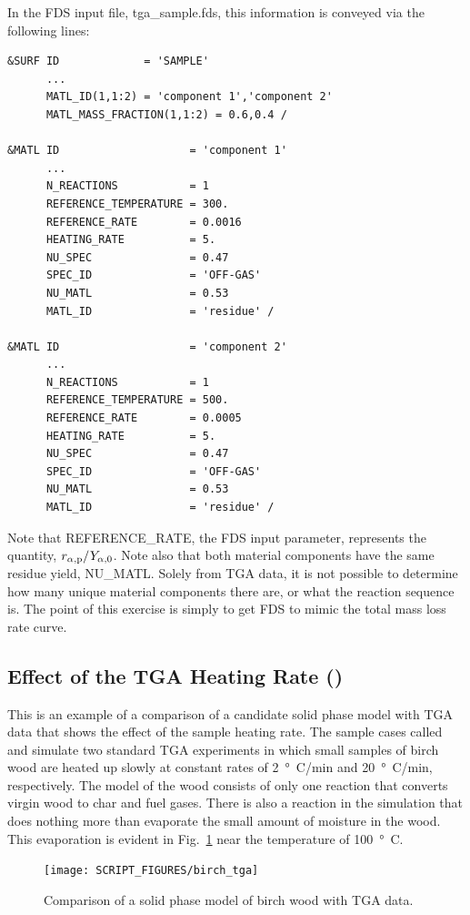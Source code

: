 \documentclass[11pt]{book}
\begin{document}
In the FDS input file, {\ct tga\_sample.fds}, this information is conveyed via the following lines:
\begin{lstlisting}
&SURF ID             = 'SAMPLE'
      ...
      MATL_ID(1,1:2) = 'component 1','component 2'
      MATL_MASS_FRACTION(1,1:2) = 0.6,0.4 /

&MATL ID                    = 'component 1'
      ...
      N_REACTIONS           = 1
      REFERENCE_TEMPERATURE = 300.
      REFERENCE_RATE        = 0.0016
      HEATING_RATE          = 5.
      NU_SPEC               = 0.47
      SPEC_ID               = 'OFF-GAS'
      NU_MATL               = 0.53
      MATL_ID               = 'residue' /

&MATL ID                    = 'component 2'
      ...
      N_REACTIONS           = 1
      REFERENCE_TEMPERATURE = 500.
      REFERENCE_RATE        = 0.0005
      HEATING_RATE          = 5.
      NU_SPEC               = 0.47
      SPEC_ID               = 'OFF-GAS'
      NU_MATL               = 0.53
      MATL_ID               = 'residue' /
\end{lstlisting}
Note that {\ct REFERENCE\_RATE}, the FDS input parameter, represents the quantity, $r_{\alpha,{\rm p}}/Y_{\alpha,0}$. Note also that both material components have the same residue yield, {\ct NU\_MATL}. Solely from TGA data, it is not possible to determine how many unique material components there are, or what the reaction sequence is. The point of this exercise is simply to get FDS to mimic the total mass loss rate curve.


\subsection{Effect of the TGA Heating Rate (\texorpdfstring{}{birch\_tga})}
\label{birch_tga}

This is an example of a comparison of a candidate solid phase model with TGA data that shows the effect of the sample heating rate. The sample cases called  and  simulate two standard TGA experiments in which small samples of birch wood are heated up slowly at constant rates of 2~\si{\degree C}/min and 20~\si{\degree C}/min, respectively. The model of the wood consists of only one reaction that converts virgin wood to char and fuel gases. There is also a reaction in the simulation that does nothing more than evaporate the small amount of moisture in the wood. This evaporation is evident in Fig.~\ref{fig_birch_tga} near the temperature of 100~\si{\degree C}.
\begin{figure}[!htb]
\centering
\texttt{[image: SCRIPT\_FIGURES/birch\_tga]}
\caption[An example of TGA data]{\label{fig_birch_tga} Comparison of a solid phase model of birch wood with TGA data.}
\end{figure}
\end{document}
